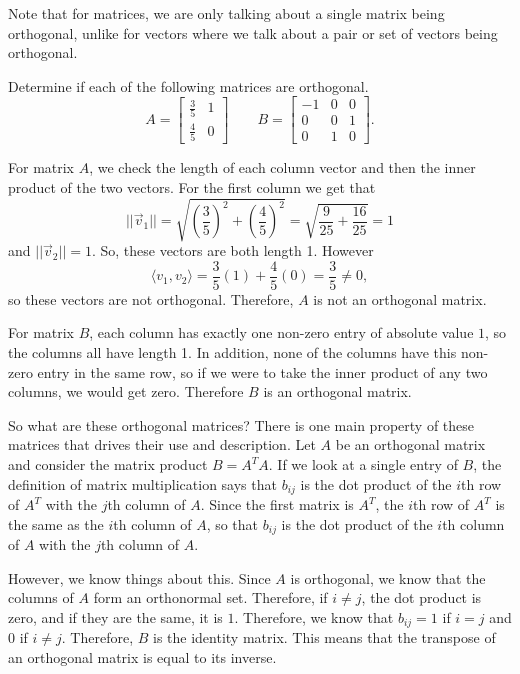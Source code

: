 Note that for matrices, we are only talking about a single matrix being orthogonal, unlike for vectors where we talk about a pair or set of vectors being orthogonal. 

\begin{example}
Determine if each of the following matrices are orthogonal.
\[ A = \begin{bmatrix} \frac{3}{5} & 1 \\ \frac{4}{5} & 0 \end{bmatrix} \qquad B = \begin{bmatrix} -1 & 0 & 0 \\ 0 & 0 & 1 \\ 0 & 1  & 0 \end{bmatrix}.\]
\end{example}

\begin{exampleSol}
For matrix $A$, we check the length of each column vector and then the inner product of the two vectors. For the first column we get that
\[ ||\vec{v}_1|| = \sqrt{\left(\frac{3}{5}\right)^2 + \left(\frac{4}{5}\right)^2} = \sqrt{\frac{9}{25} + \frac{16}{25}} = 1 \] and $||\vec{v}_2|| = 1$. So, these vectors are both length 1. However
\[ \langle v_1, v_2 \rangle = \frac{3}{5}(1) + \frac{4}{5}(0) = \frac{3}{5} \neq 0, \] so these vectors are not orthogonal. Therefore, $A$ is not an orthogonal matrix.

For matrix $B$, each column has exactly one non-zero entry of absolute value $1$, so the columns all have length 1. In addition, none of the columns have this non-zero entry in the same row, so if we were to take the inner product of any two columns, we would get zero. Therefore $B$ is an orthogonal matrix. 
\end{exampleSol}

So what are these orthogonal matrices? There is one main property of these matrices that drives their use and description. Let $A$ be an orthogonal matrix and consider the matrix product $B = A^TA$. If we look at a single entry of $B$, the definition of matrix multiplication says that $b_{ij}$ is the dot product of the $i$th row of $A^T$ with the $j$th column of $A$. Since the first matrix is $A^T$, the $i$th row of $A^T$ is the same as the $i$th column of $A$, so that $b_{ij}$ is the dot product of the $i$th column of $A$ with the $j$th column of $A$. 

However, we know things about this. Since $A$ is orthogonal, we know that the columns of $A$ form an orthonormal set. Therefore, if $i \neq j$, the dot product is zero, and if they are the same, it is $1$. Therefore, we know that $b_{ij} = 1$ if $i=j$ and $0$ if $i \neq j$. Therefore, $B$ is the identity matrix. This means that the transpose of an orthogonal matrix is equal to its inverse.

